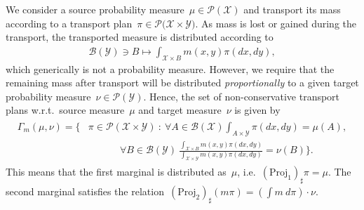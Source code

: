 \documentclass{article}
\theoremstyle{definition}
\begin{document}
We consider a source probability measure~$\mu \in \mathcal{P}(\mathcal{X})$ and transport its mass according to a transport plan~$\pi \in \mathcal{P(} \mathcal{X} \times \mathcal{Y})$. As mass is lost or gained during the transport, the transported measure is distributed according to
\begin{align*}
  \mathcal{B}(\mathcal{Y}) \ni B \mapsto  \int_{\mathcal{X} \times B} m(x,y) \pi(dx,dy),
\end{align*}
which generically is not a probability measure. However, we require that the remaining mass after transport will be distributed \textit{proportionally} to a given target probability measure~$\nu \in \mathcal{P}(\mathcal{Y})$. Hence, the set of non-conservative transport plans w.r.t.~source measure~$\mu$ and target measure~$\nu$ is given by
\begin{align}
\begin{split}\label{equ:def_gamma_m}
\Gamma_m(\mu, \nu)  = \Big\{  & \pi \in \mathcal{P} (\mathcal{X} \times \mathcal {Y} ) \ :    \  \forall A \in \mathcal{B}(\mathcal{X}) \int_{ A \times \mathcal{Y}} \pi(dx,dy) = \mu(A),   \\ 
& \quad \quad \quad   \ \forall B \in \mathcal{B}(\mathcal{Y}) \  \frac{\int_{\mathcal{X} \times B} m(x,y) \pi(dx,dy)}{\int_{\mathcal{X} \times \mathcal{Y}} m(x,y)\pi(dx,dy)} =  \nu(B)  \Big\}. 
\end{split}
\end{align}
This means that the first marginal is distributed as~$\mu$, i.e.~$(\mbox{Proj}_1)_{\sharp} \pi = \mu$. The second marginal satisfies the relation~$(\mbox{Proj}_2)_{\sharp} (m \pi) = \left( \int m \ d \pi  \right)  \cdot \nu$.
\end{document}
